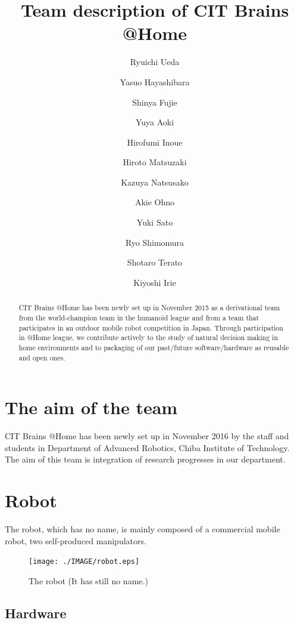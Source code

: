 \documentclass{llncs}
\begin{document}
\title{Team description of CIT Brains @Home}

\author{Ryuichi Ueda \and
Yasuo Hayashibara \and
Shinya Fujie \and
Yuya Aoki \and
Hirofumi Inoue \and
Hiroto Matsuzaki \and
Kazuya Natsusako \and
Akie Ohno \and
Yuki Sato \and
Ryo Shimomura \and
Shotaro Terato \and
Kiyoshi Irie
}


\maketitle
%
\begin{abstract}
CIT Brains @Home has been newly set up in November 2015
as a derivational team from the world-champion team
in the humanoid league and from a team that participates in
an outdoor mobile robot competition in Japan.
Through participation in @Home league,
we contribute actively to the study of natural decision making
in home environments and to packaging of our past/future
software/hardware as reusable and open ones.
\end{abstract}

\section{The aim of the team}

CIT Brains @Home has been newly set up in November 2016
by the staff and students in Department of Advanced Robotics,
Chiba Institute of Technology.
The aim of this team is integration of research progresses
in our department.

\section{Robot}
The robot, which has no name, is mainly composed of a commercial mobile robot,
two self-produced manipulators.

\begin{figure}[h]
	\begin{center}
		\texttt{[image: ./IMAGE/robot.eps]}
		\caption{The robot (It has still no name.)}
		\label{fig:robot}
	\end{center}
\end{figure}

\subsection{Hardware}
\end{document}
